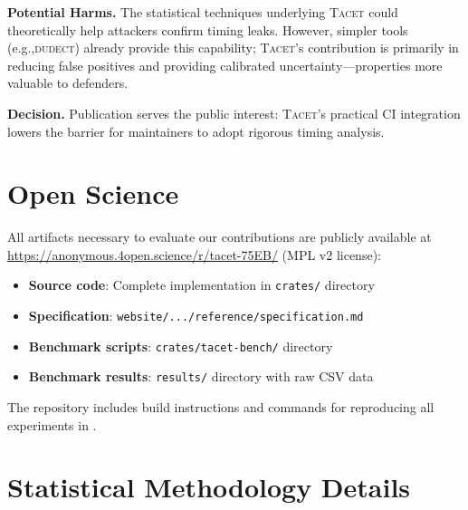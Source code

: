 \documentclass[letterpaper,twocolumn,10pt]{article}
\newcommand{\tacet}{\textsc{Tacet}\xspace}
\newcommand{\dudect}{\textsc{dudect}\xspace}
\newcommand{\eg}{e.g.,\xspace}
\begin{document}
\smallskip
\noindent\textbf{Potential Harms.}
The statistical techniques underlying \tacet could theoretically help attackers
confirm timing leaks. However, simpler tools (\eg \dudect) already provide
this capability; \tacet's contribution is primarily in reducing false positives
and providing calibrated uncertainty---properties more valuable to defenders.

\smallskip
\noindent\textbf{Decision.}
Publication serves the public interest: \tacet's practical CI integration
lowers the barrier for maintainers to adopt rigorous timing analysis.

\section*{Open Science}
\label{app:open-science}

\noindent All artifacts necessary to evaluate our contributions are publicly available
at \url{https://anonymous.4open.science/r/tacet-75EB/} (MPL v2 license):
\begin{itemize}[nosep,leftmargin=*]
    \item \textbf{Source code}: Complete implementation in \texttt{crates/} directory
    \item \textbf{Specification}: \texttt{website/.../reference/specification.md}
    \item \textbf{Benchmark scripts}: \texttt{crates/tacet-bench/} directory
    \item \textbf{Benchmark results}: \texttt{results/} directory with raw CSV data
\end{itemize}
The repository includes build instructions and commands for reproducing all
experiments in .

{\small


}

\clearpage
\appendix

\section{Statistical Methodology Details}
\label{app:methodology}
\end{document}
